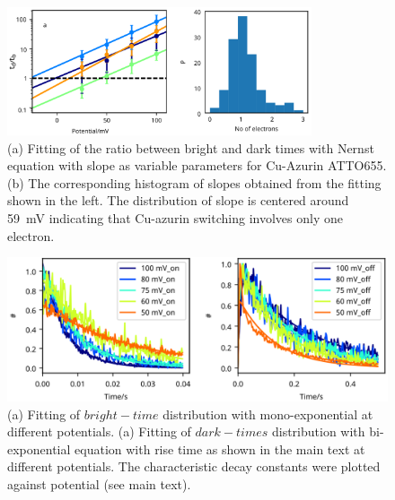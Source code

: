\squeezeup
\begin{figure}[ht]
  \centering
  \includegraphics[width=0.8\textwidth]{SI_potential_slope}
  \makeatletter
  \renewcommand{\fnum@figure}{\figurename~S\thefigure}
  \makeatother
  \caption{(a) Fitting of the ratio between bright and dark times with Nernst equation with slope as variable parameters for Cu-Azurin ATTO655. 
  (b) The corresponding histogram of slopes obtained from the fitting shown in the left.
  The distribution of slope is centered around \SI{59}{\mV} indicating that Cu-azurin switching  involves only one electron.}
  \label{SIfig:potential_slope}
\end{figure}
\squeezeup
\begin{figure}[ht]
  \centering
  \includegraphics[width=\textwidth]{rate_fit_all_potential}
  \makeatletter
  \renewcommand{\fnum@figure}{\figurename~S\thefigure}
  \makeatother
  \caption{(a) Fitting of $bright-time$ distribution with mono-exponential at different potentials.
  (a) Fitting of $dark-times$ distribution with bi-exponential equation with rise time as shown in the main text at different potentials.
  The characteristic decay constants were plotted against potential (see main text).}
  \label{SIfig: rate_fit_all_potential}
\end{figure}

\clearpage

